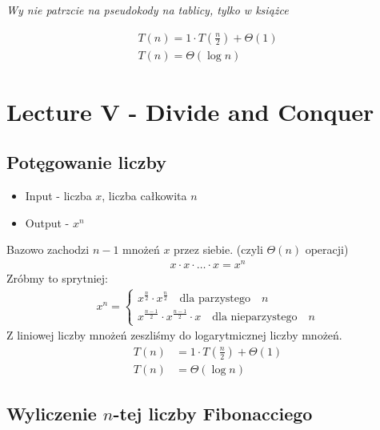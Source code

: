 \documentclass{article}
\begin{document}
\vspace{1cm}

\textit{Wy nie patrzcie na pseudokody na tablicy, tylko w książce}

\vspace{1cm}

\begin{align}
    T(n) = 1 \cdot T\left(\frac{n}{2}\right) + \Theta(1) \\
    T(n) = \Theta(\log n)
\end{align}

\section{Lecture V - Divide and Conquer}

\subsection{Potęgowanie liczby}

\begin{itemize}
    \item Input - liczba $x$, liczba całkowita $n$
    \item Output - $x^n$
\end{itemize}
Bazowo zachodzi $n-1$ mnożeń $x$ przez siebie. (czyli $\Theta(n)$ operacji)
\begin{align}
    x \cdot x \cdot \dots \cdot x = x^{n}
\end{align}
Zróbmy to sprytniej:
\begin{align}
    x^n = \begin{cases}
        x^{\frac{n}{2}} \cdot x^{\frac{n}{2}} \quad \text{dla parzystego} \quad n\\
        x^{\frac{n-1}{2}} \cdot x^{\frac{n-1}{2}} \cdot x \quad \text{dla nieparzystego} \quad n
    \end{cases}
\end{align}
Z liniowej liczby mnożeń zeszliśmy do logarytmicznej liczby mnożeń.\\
\begin{align}
    T(n) &= 1\cdot T\left(\frac{n}{2}\right) + \Theta(1)\\
    T(n) &= \Theta(\log n)
\end{align}

\subsection{Wyliczenie $n$-tej liczby Fibonacciego}
\end{document}
